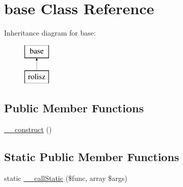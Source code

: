 \hypertarget{classbase}{
\section{base Class Reference}
\label{classbase}
}
Inheritance diagram for base:\begin{figure}[H]
\begin{center}
\leavevmode
\includegraphics[height=2.000000cm]{classbase}
\end{center}
\end{figure}
\subsection*{Public Member Functions}
\begin{DoxyCompactItemize}
\item 
\hyperlink{classbase_a095c5d389db211932136b53f25f39685}{\_\-\_\-construct} ()
\end{DoxyCompactItemize}
\subsection*{Static Public Member Functions}
\begin{DoxyCompactItemize}
\item 
static \hyperlink{classbase_a9fa8e32de2139fd5e55c102dcdf9120f}{\_\-\_\-callStatic} (\$func, array \$args)
\end{DoxyCompactItemize}
